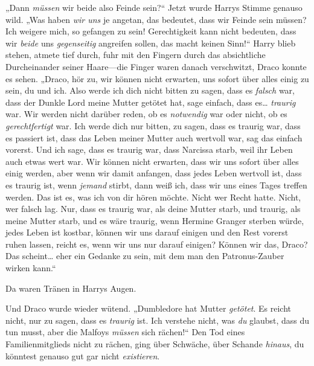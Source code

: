 „Dann \emph{müssen} wir beide also Feinde sein?“ Jetzt wurde Harrys Stimme genauso wild. „Was haben \emph{wir uns} je angetan, das bedeutet, dass wir Feinde sein müssen? Ich weigere mich, so gefangen zu sein! Gerechtigkeit kann nicht bedeuten, dass wir \emph{beide} uns \emph{gegenseitig} angreifen sollen, das macht keinen Sinn!“ Harry blieb stehen, atmete tief durch, fuhr mit den Fingern durch das absichtliche Durcheinander seiner Haare—die Finger waren danach verschwitzt, Draco konnte es sehen. „Draco, hör zu, wir können nicht erwarten, uns sofort über alles einig zu sein, du und ich. Also werde ich dich nicht bitten zu sagen, dass es \emph{falsch} war, dass der Dunkle Lord meine Mutter getötet hat, sage einfach, dass es… \emph{traurig} war. Wir werden nicht darüber reden, ob es \emph{notwendig} war oder nicht, ob es \emph{gerechtfertigt} war. Ich werde dich nur bitten, zu sagen, dass es traurig war, dass es passiert ist, dass das Leben meiner Mutter auch wertvoll war, sag das einfach vorerst. Und ich sage, dass es traurig war, dass Narcissa starb, weil ihr Leben auch etwas wert war. Wir können nicht erwarten, dass wir uns sofort über alles einig werden, aber wenn wir damit anfangen, dass jedes Leben wertvoll ist, dass es traurig ist, wenn \emph{jemand} stirbt, dann weiß ich, dass wir uns eines Tages treffen werden. Das ist es, was ich von dir hören möchte. Nicht wer Recht hatte. Nicht, wer falsch lag. Nur, dass es traurig war, als deine Mutter starb, und traurig, als meine Mutter starb, und es wäre traurig, wenn Hermine Granger sterben würde, jedes Leben ist kostbar, können wir uns darauf einigen und den Rest vorerst ruhen lassen, reicht es, wenn wir uns nur darauf einigen? Können wir das, Draco? Das scheint… eher ein Gedanke zu sein, mit dem man den Patronus-Zauber wirken kann.“

Da waren Tränen in Harrys Augen.

Und Draco wurde wieder wütend. „Dumbledore hat Mutter \emph{getötet}. Es reicht nicht, nur zu sagen, dass es \emph{traurig} ist. Ich verstehe nicht, was \emph{du} glaubst, dass du tun musst, aber die Malfoys \emph{müssen} sich rächen!“ Den Tod eines Familienmitglieds nicht zu rächen, ging über Schwäche, über Schande \emph{hinaus}, du könntest genauso gut gar nicht \emph{existieren}.

